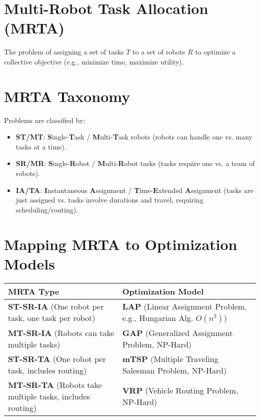 \documentclass[8pt,a4paper,twocolumn]{article}
\newcommand{\0}{\mathbf{0}}
\begin{document}
\section*{Multi-Robot Task Allocation (MRTA)}
The problem of assigning a set of tasks $T$ to a set of robots $R$ to optimize a collective objective (e.g., minimize time, maximize utility).

\section*{MRTA Taxonomy}
Problems are classified by:
\begin{itemize}
    \item \textbf{ST/MT}: \textbf{S}ingle-\textbf{T}ask / \textbf{M}ulti-\textbf{T}ask robots (robots can handle one vs. many tasks at a time).
    \item \textbf{SR/MR}: \textbf{S}ingle-\textbf{R}obot / \textbf{M}ulti-\textbf{R}obot tasks (tasks require one vs. a team of robots).
    \item \textbf{IA/TA}: \textbf{I}nstantaneous \textbf{A}ssignment / \textbf{T}ime-\textbf{E}xtended \textbf{A}ssignment (tasks are just assigned vs. tasks involve durations and travel, requiring scheduling/routing).
\end{itemize}

\section*{Mapping MRTA to Optimization Models}
\begin{tabular}{@{}ll@{}}
\toprule
\textbf{MRTA Type} & \textbf{Optimization Model} \\
\midrule
\textbf{ST-SR-IA} (One robot per task, one task per robot) & \textbf{LAP} (Linear Assignment Problem, e.g., Hungarian Alg. $O(n^3)$) \\
\textbf{MT-SR-IA} (Robots can take multiple tasks) & \textbf{GAP} (Generalized Assignment Problem, NP-Hard) \\
\textbf{ST-SR-TA} (One robot per task, includes routing) & \textbf{mTSP} (Multiple Traveling Salesman Problem, NP-Hard) \\
\textbf{MT-SR-TA} (Robots take multiple tasks, includes routing) & \textbf{VRP} (Vehicle Routing Problem, NP-Hard) \\
\bottomrule
\end{tabular}
\end{document}
